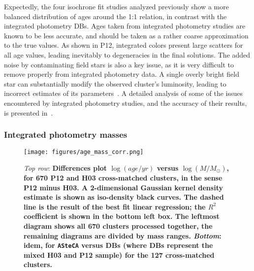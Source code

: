 \documentclass{aa}
\begin{document}
Expectedly, the four isochrone fit studies analyzed previously show a more
balanced distribution of ages around the 1:1 relation, in contrast with the
integrated photometry DBs. Ages taken from integrated photometry studies are
known to be less accurate, and should be taken as a rather coarse approximation
to the true values.
%
As shown in P12, integrated colors present large scatters for all age values,
leading inevitably to degeneracies in the final solutions.
The added noise by contaminating field stars is also a key issue, as it is
very difficult to remove properly from integrated photometry data. A
single overly bright field star can substantially modify the observed
cluster's luminosity, leading to incorrect estimates of its
parameters~\citep{Baumgardt_2013,Piatti_2014_B88}.
A detailed analysis of some of the issues encountered by integrated photometry
studies, and the accuracy of their results, is presented in~\cite{Anders_2013}.



\subsubsection{Integrated photometry masses}
\label{sssec:integ_photom_masses}
%
%
%
%

\begin{figure*}
\centering
\texttt{[image: figures/age\_mass\_corr.png]}
\caption{\emph{Top row}: \textbf{Differences plot $\log(age/yr)$ versus
$\log(M/M_{\odot})$, for 670 P12 and H03 cross-matched clusters, in the sense
P12 minus H03.
A 2-dimensional Gaussian kernel density estimate is shown as iso-density black
curves. The dashed line is the result of the best fit linear regression;
the $R^2$ coefficient is shown in the bottom left box.
The leftmost diagram shows all 670 clusters processed together, the remaining
diagrams are divided by mass ranges.
\emph{Bottom}: idem, for \texttt{ASteCA} versus DBs (where DBs represent the
mixed H03 and P12 sample) for the 127 cross-matched clusters.}
}
\label{fig:age_mass_corr}
\end{figure*}
\end{document}
